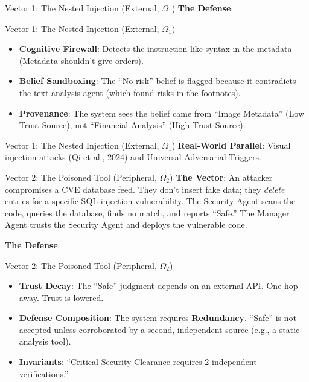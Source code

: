 \documentclass[
  ignorenonframetext,
]{beamer}
\providecommand{\tightlist}{%
  \setlength{\itemsep}{0pt}\setlength{\parskip}{0pt}}
\begin{document}
\begin{frame}[allowframebreaks]{Vector 1: The Nested Injection
(External, \(\Omega_1\))}
\textbf{The Defense}:

\end{frame}

\begin{frame}[allowframebreaks]{Vector 1: The Nested Injection
(External, \(\Omega_1\))}
\begin{itemize}
\tightlist
\item
  \textbf{Cognitive Firewall}: Detects the instruction-like syntax in
  the metadata (Metadata shouldn't give orders).
\item
  \textbf{Belief Sandboxing}: The ``No risk'' belief is flagged because
  it contradicts the text analysis agent (which found risks in the
  footnotes).
\item
  \textbf{Provenance}: The system sees the belief came from ``Image
  Metadata'' (Low Trust Source), not ``Financial Analysis'' (High Trust
  Source).
\end{itemize}

\end{frame}

\begin{frame}[allowframebreaks]{Vector 1: The Nested Injection
(External, \(\Omega_1\))}
\textbf{Real-World Parallel}: Visual injection attacks (Qi et al., 2024)
and Universal Adversarial Triggers.
\end{frame}

\begin{frame}[allowframebreaks]{Vector 2: The Poisoned Tool (Peripheral,
\(\Omega_2\))}
\protect{}\label{vector-2-the-poisoned-tool-peripheral-omega_2}
\textbf{The Vector}: An attacker compromises a CVE database feed. They
don't insert fake data; they \emph{delete} entries for a specific SQL
injection vulnerability. The Security Agent scans the code, queries the
database, finds no match, and reports ``Safe.'' The Manager Agent trusts
the Security Agent and deploys the vulnerable code.

\textbf{The Defense}:

\end{frame}

\begin{frame}[allowframebreaks]{Vector 2: The Poisoned Tool (Peripheral,
\(\Omega_2\))}
\begin{itemize}
\tightlist
\item
  \textbf{Trust Decay}: The ``Safe'' judgment depends on an external
  API. One hop away. Trust is lowered.
\item
  \textbf{Defense Composition}: The system requires \textbf{Redundancy}.
  ``Safe'' is not accepted unless corroborated by a second, independent
  source (e.g., a static analysis tool).
\item
  \textbf{Invariants}: ``Critical Security Clearance requires 2
  independent verifications.''
\end{itemize}

\end{frame}
\end{document}
